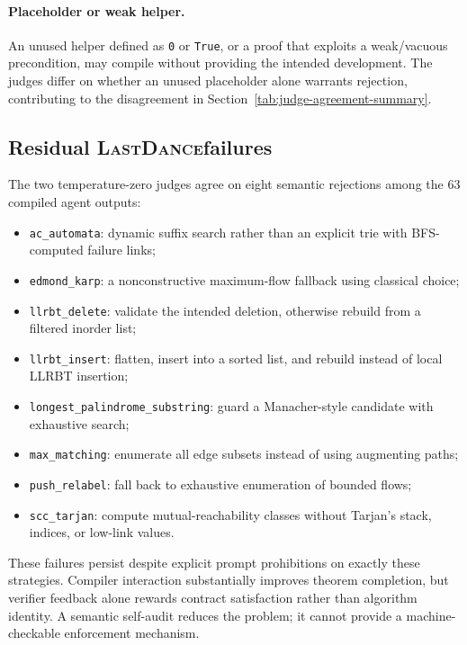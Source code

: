 \documentclass{article}
\newcommand{\task}[1]{\texttt{#1}}
\newcommand{\lastdance}{\textsc{LastDance}}
\begin{document}
\paragraph{Placeholder or weak helper.}
An unused helper defined as \texttt{0} or \texttt{True}, or a proof that exploits a
weak/vacuous precondition, may compile without providing the intended development.  The
judges differ on whether an unused placeholder alone warrants rejection, contributing
to the disagreement in Section~\ref{tab:judge-agreement-summary}.

\subsection{Residual \lastdance failures}

The two temperature-zero judges agree on eight semantic rejections among the 63 compiled
agent outputs:

\begin{itemize}[leftmargin=*,itemsep=2pt]
  \item \task{ac\_automata}: dynamic suffix search rather than an explicit trie with
        BFS-computed failure links;
  \item \task{edmond\_karp}: a nonconstructive maximum-flow fallback using classical
        choice;
  \item \task{llrbt\_delete}: validate the intended deletion, otherwise rebuild from a
        filtered inorder list;
  \item \task{llrbt\_insert}: flatten, insert into a sorted list, and rebuild instead of
        local LLRBT insertion;
  \item \task{longest\_palindrome\_substring}: guard a Manacher-style candidate with
        exhaustive search;
  \item \task{max\_matching}: enumerate all edge subsets instead of using augmenting
        paths;
  \item \task{push\_relabel}: fall back to exhaustive enumeration of bounded flows;
  \item \task{scc\_tarjan}: compute mutual-reachability classes without Tarjan's stack,
        indices, or low-link values.
\end{itemize}

These failures persist despite explicit prompt prohibitions on exactly these strategies.
Compiler interaction substantially improves theorem completion, but verifier feedback
alone rewards contract satisfaction rather than algorithm identity.  A semantic
self-audit reduces the problem; it cannot provide a machine-checkable enforcement
mechanism.
\end{document}
